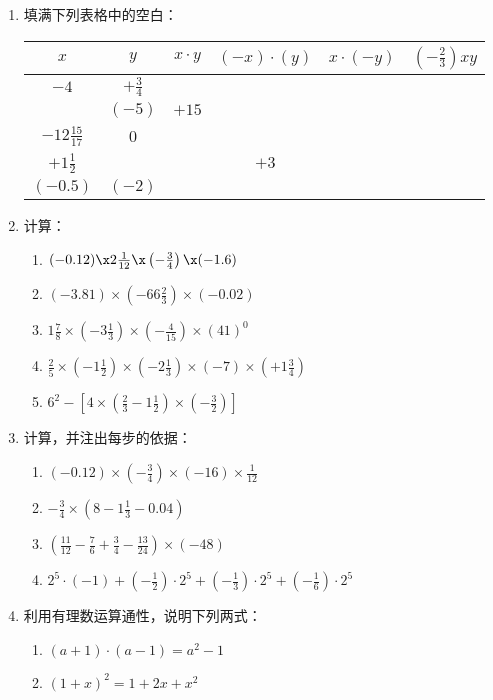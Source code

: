 \begin{enumerate}
	\item 填满下列表格中的空白：
	\begin{center}
		\begin{tabular}{c|c|c|c|c|c}
			\hline
			$x$  &  $y$  &  $x\cdot y$  &  $(-x)\cdot (y)$  &     $x\cdot (-y)$  &  $\left(-\frac{2}{3}\right)xy$\\
			\hline
			$-4$ & $+\frac{3}{4}$ &&&&\\
			& $(-5)$ & $+15$ &&& \\
			$-12\frac{15}{17}$ & 0&&&&\\
			$+1\frac{1}{2}$ & & & $+3$&&\\
			$(-0.5)$ & $(-2)$ &&&&\\
			\hline
		\end{tabular}    
	\end{center}
	
	\item 计算：
	\begin{enumerate}
		\item $(-0.12)\x 2\frac{1}{12}\x\left(-\frac{3}{4}\right)\x(-1.6)$
		\item $(-3.81) \times\left(-66 \frac{2}{3}\right) \times(-0.02)$
		\item $1 \frac{7}{8} \times\left(-3 \frac{1}{3}\right) \times\left(-\frac{4}{15}\right) \times(41)^{0}$
		\item $\frac{2}{5} \times\left(-1 \frac{1}{2}\right) \times\left(-2 \frac{1}{3}\right) \times(-7) \times\left(+1 \frac{3}{4}\right)$
		\item  $6^{2}-\left[4 \times\left(\frac{2}{3}-1 \frac{1}{2}\right) \times\left(-\frac{3}{2}\right)\right]$
	\end{enumerate}
	
	
	\item 计算，并注出每步的依据：
	\begin{enumerate}
		\item $(-0.12) \times\left(-\frac{3}{4}\right) \times(-16) \times \frac{1}{12}$
		\item $-\frac{3}{4} \times\left(8-1 \frac{1}{3}-0.04\right)$
		\item $\left(\frac{11}{12}-\frac{7}{6}+\frac{3}{4}-\frac{13}{24}\right) \times(-48)$
		\item $2^{5} \cdot(-1)+\left(-\frac{1}{2}\right) \cdot 2^{5}+\left(-\frac{1}{3}\right) \cdot 2^{5}+\left(-\frac{1}{6}\right) \cdot 2^{5}$
	\end{enumerate}
	
	\item 利用有理数运算通性，说明下列两式：
	\begin{enumerate}
		\item $(a + 1)\cdot (a-1) =a^2-1$
		\item $(1+ x)^2=1+2x+x^2$
	\end{enumerate}
	

\end{enumerate}
